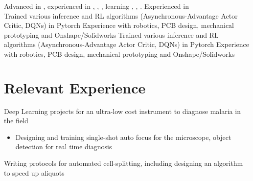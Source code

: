 \documentclass[]{deedy-resume-openfont}
\begin{document}

\begin{minipage}[t]{\textwidth}
   Advanced in , experienced in , , , learning , , . Experienced in \\
  \ifdef{\software} {
     Trained various inference and RL algorithms (Asynchronous-Advantage Actor Critic, DQNs) in Pytorch
  } {
    \ifdef{\robotics} {
       Experience with robotics, PCB design, mechanical prototyping and Onshape/Solidworks
    } {
       Trained various inference and RL algorithms (Asynchronous-Advantage Actor Critic, DQNs) in Pytorch
       Experience with robotics, PCB design, mechanical prototyping and Onshape/Solidworks
    }
  }
\end{minipage}

\vspace{12pt}

\section{Relevant Experience}

\begin{tightemize}
    \item Deep Learning projects for an ultra-low cost instrument to diagnose malaria in the field
      \begin{itemize}
        \item Designing and training single-shot auto focus for the microscope, object detection for real time diagnosis
      \end{itemize}
    \item Writing protocols for automated cell-splitting, including designing an algorithm to speed up aliquots
\end{tightemize}
\end{document}
